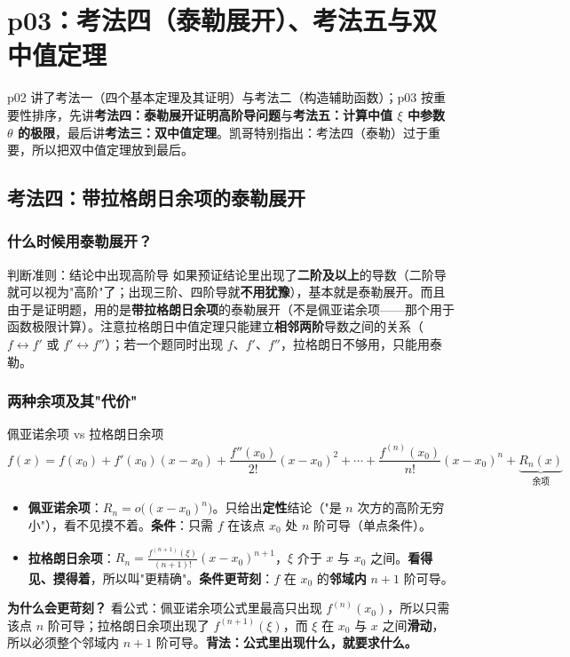 \documentclass[a4paper]{article}
\begin{document}
\section{p03：考法四（泰勒展开）、考法五与双中值定理}

p02 讲了考法一（四个基本定理及其证明）与考法二（构造辅助函数）；p03 按重要性排序，先讲\textbf{考法四：泰勒展开证明高阶导问题}与\textbf{考法五：计算中值 $\xi$ 中参数 $\theta$ 的极限}，最后讲\textbf{考法三：双中值定理}。凯哥特别指出：考法四（泰勒）过于重要，所以把双中值定理放到最后。

\subsection{考法四：带拉格朗日余项的泰勒展开}

\subsubsection{什么时候用泰勒展开？}

\begin{importantbox}{判断准则：结论中出现高阶导}
如果预证结论里出现了\textbf{二阶及以上}的导数（二阶导就可以视为"高阶"了；出现三阶、四阶导就\textbf{不用犹豫}），基本就是泰勒展开。而且由于是证明题，用的是\textbf{带拉格朗日余项}的泰勒展开（不是佩亚诺余项——那个用于函数极限计算）。注意拉格朗日中值定理只能建立\textbf{相邻两阶}导数之间的关系（$f\leftrightarrow f'$ 或 $f'\leftrightarrow f''$）；若一个题同时出现 $f$、$f'$、$f''$，拉格朗日不够用，只能用泰勒。
\end{importantbox}

\subsubsection{两种余项及其"代价"}

\begin{knowledgebox}{佩亚诺余项 vs 拉格朗日余项}
\[
f(x)=f(x_0)+f'(x_0)(x-x_0)+\frac{f''(x_0)}{2!}(x-x_0)^2+\cdots+\frac{f^{(n)}(x_0)}{n!}(x-x_0)^n+\underbrace{R_n(x)}_{\text{余项}}
\]
\begin{itemize}
\item \textbf{佩亚诺余项}：$R_n=o\big((x-x_0)^n\big)$。只给出\textbf{定性}结论（"是 $n$ 次方的高阶无穷小"），看不见摸不着。\textbf{条件}：只需 $f$ 在该点 $x_0$ 处 $n$ 阶可导（单点条件）。
\item \textbf{拉格朗日余项}：$R_n=\frac{f^{(n+1)}(\xi)}{(n+1)!}(x-x_0)^{n+1}$，$\xi$ 介于 $x$ 与 $x_0$ 之间。\textbf{看得见、摸得着}，所以叫"更精确"。\textbf{条件更苛刻}：$f$ 在 $x_0$ 的\textbf{邻域内} $n+1$ 阶可导。
\end{itemize}
\textbf{为什么会更苛刻？} 看公式：佩亚诺余项公式里最高只出现 $f^{(n)}(x_0)$，所以只需该点 $n$ 阶可导；拉格朗日余项出现了 $f^{(n+1)}(\xi)$，而 $\xi$ 在 $x_0$ 与 $x$ 之间\textbf{滑动}，所以必须整个邻域内 $n+1$ 阶可导。\textbf{背法：公式里出现什么，就要求什么。}
\end{knowledgebox}
\end{document}
